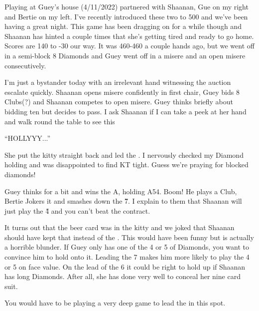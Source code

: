 \documentclass[a4paper]{JoshCards}
\begin{document}
Playing at Guey's house (4/11/2022) partnered with Shaanan, Gue on my right and Bertie on my left. I've recently introduced these two to 500 and we've been having a great night. This game has been dragging on for a while though and Shaanan has hinted a couple times that she's getting tired and ready to go home. Scores are 140 to -30 our way. It was 460-460 a couple hands ago, but we went off in a semi-block 8 Diamonds and Guey went off in a misere and an open misere consecutively.

I'm just a bystander today with an irrelevant hand witnessing the auction escalate quickly. Shaanan opens misere confidently in first chair, Guey bids 8 Clubs(?) and Shaanan competes to open misere. Guey thinks briefly about bidding ten but decides to pass. I ask Shaanan if I can take a peek at her hand and walk round the table to see this
\begin{center}
\end{center}

``HOLLYYY...''

She put the kitty straight back and led the . I nervously checked my Diamond holding and was disappointed to find KT tight. Guess we're praying for blocked diamonds! 

Guey thinks for a bit and wins the \D A, holding A54. Boom! He plays a Club, Bertie Jokers it and smashes down the \H 7. I explain to them that Shaanan will just play the \H 4 and you can't beat the contract. 

It turns out that the beer card was in the kitty and we joked that Shaanan should have kept that instead of the . This would have been funny but is actually a horrible blunder. If Guey only has one of the 4 or 5 of Diamonds, you want to convince him to hold onto it. Leading the 7 makes him more likely to play the 4 or 5 on face value. On the lead of the 6 it could be right to hold up if Shaanan has long Diamonds. After all, she has done very well to conceal her nine card suit. 

You would have to be playing a very deep game to lead the  in this spot. 
\end{document}
